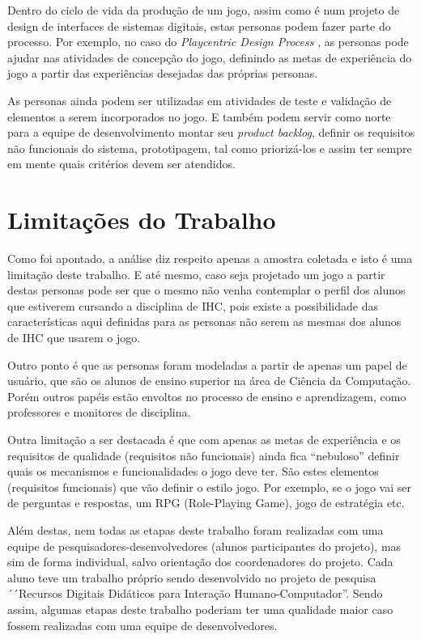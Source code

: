 Dentro do ciclo de vida da produção de um jogo, assim como é num projeto de design de interfaces de sistemas digitais, estas personas podem fazer parte do processo. Por exemplo, no caso do \textit{Playcentric Design Process} \cite{Fullerton_2008}, as personas pode ajudar nas atividades de concepção do jogo, definindo as metas de experiência do jogo a partir das experiências desejadas das próprias personas.

As personas ainda podem ser utilizadas em atividades de teste e validação de elementos a serem incorporados no jogo. E também podem servir como norte para a equipe de desenvolvimento montar seu \textit{product backlog}, definir os requisitos não funcionais do sistema, prototipagem, tal como priorizá-los e assim ter sempre em mente quais critérios devem ser atendidos.

\section{Limitações do Trabalho}

Como foi apontado, a análise diz respeito apenas a amostra coletada e isto é uma limitação deste trabalho. E até mesmo, caso seja projetado um jogo a partir destas personas pode ser que o mesmo não venha contemplar o perfil dos alunos que estiverem cursando a disciplina de IHC, pois existe a possibilidade das características aqui definidas para as personas não serem as mesmas dos alunos de IHC que usarem o jogo.

Outro ponto é que as personas foram modeladas a partir de apenas um papel de usuário, que são os alunos de ensino superior na área de Ciência da Computação. Porém outros papéis estão envoltos no processo de ensino e aprendizagem, como professores e monitores de disciplina.

Outra limitação a ser destacada é que com apenas as metas de experiência e os requisitos de qualidade (requisitos não funcionais) ainda fica ``nebuloso'' definir quais os mecanismos e funcionalidades o jogo deve ter. São estes elementos (requisitos funcionais) que vão definir o estilo jogo. Por exemplo, se o jogo vai ser de perguntas e respostas, um RPG (Role-Playing Game), jogo de estratégia etc. 

Além destas, nem todas as etapas deste trabalho foram realizadas com uma equipe de pesquisadores-desenvolvedores (alunos participantes do projeto), mas sim de forma individual, salvo orientação dos coordenadores do projeto. Cada aluno teve um trabalho próprio sendo desenvolvido no projeto de pesquisa  ´´Recursos Digitais Didáticos para Interação Humano-Computador''. Sendo assim, algumas etapas deste trabalho poderiam ter uma qualidade maior caso fossem realizadas com uma equipe de desenvolvedores.

